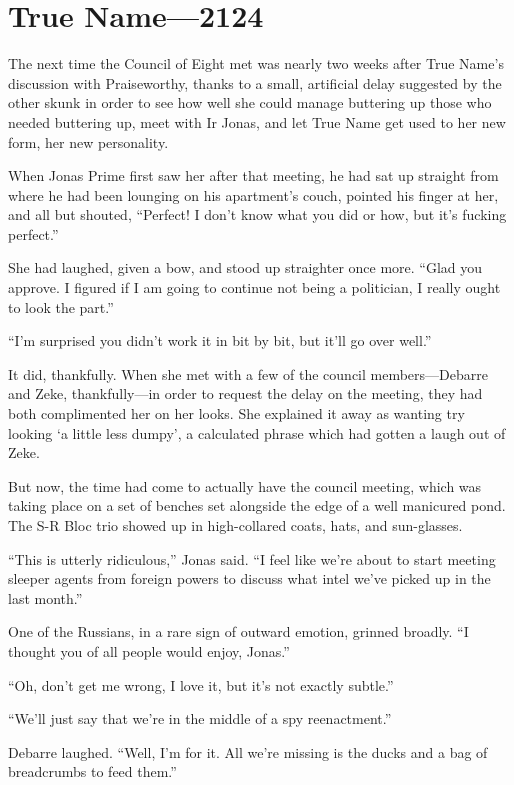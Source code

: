 \hypertarget{true-name-2124}{%
\chapter{True Name—2124}\label{true-name-2124}}

The next time the Council of Eight met was nearly two weeks after True Name's discussion with Praiseworthy, thanks to a small, artificial delay suggested by the other skunk in order to see how well she could manage buttering up those who needed buttering up, meet with Ir Jonas, and let True Name get used to her new form, her new personality.

When Jonas Prime first saw her after that meeting, he had sat up straight from where he had been lounging on his apartment's couch, pointed his finger at her, and all but shouted, ``Perfect! I don't know what you did or how, but it's fucking perfect.''

She had laughed, given a bow, and stood up straighter once more. ``Glad you approve. I figured if I am going to continue not being a politician, I really ought to look the part.''

``I'm surprised you didn't work it in bit by bit, but it'll go over well.''

It did, thankfully. When she met with a few of the council members---Debarre and Zeke, thankfully---in order to request the delay on the meeting, they had both complimented her on her looks. She explained it away as wanting try looking `a little less dumpy', a calculated phrase which had gotten a laugh out of Zeke.

But now, the time had come to actually have the council meeting, which was taking place on a set of benches set alongside the edge of a well manicured pond. The S-R Bloc trio showed up in high-collared coats, hats, and sun-glasses.

``This is utterly ridiculous,'' Jonas said. ``I feel like we're about to start meeting sleeper agents from foreign powers to discuss what intel we've picked up in the last month.''

One of the Russians, in a rare sign of outward emotion, grinned broadly. ``I thought you of all people would enjoy, Jonas.''

``Oh, don't get me wrong, I love it, but it's not exactly subtle.''

``We'll just say that we're in the middle of a spy reenactment.''

Debarre laughed. ``Well, I'm for it. All we're missing is the ducks and a bag of breadcrumbs to feed them.''

